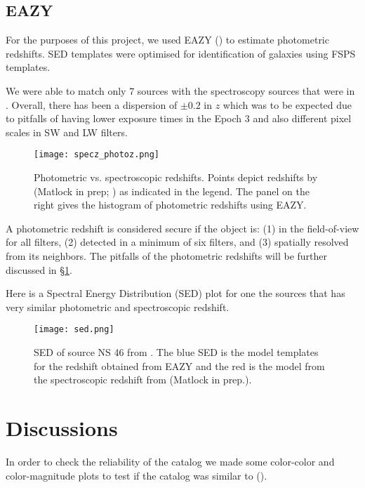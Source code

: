 \documentclass[twocolumn,linenumbers]{aastex631}
\begin{document}
\subsection{EAZY}

For the purposes of this project, we used EAZY (\cite{brammer2008eazy}) to estimate photometric redshifts. SED templates were optimised for identification of galaxies using FSPS templates.

We were able to match only 7 sources with the spectroscopy sources that were in \cite{frye2023jwst}. Overall, there has been a dispersion of $\pm 0.2$ in $z$ which was to be expected due to pitfalls of having lower exposure times in the Epoch 3 and also different pixel scales in SW and LW filters.

\begin{figure}[H]
    \centering\texttt{[image: specz\_photoz.png]}
    \caption{Photometric vs. spectroscopic redshifts. Points depict redshifts by (Matlock in prep; \cite{frye2023jwst}) as indicated in the legend. The panel on the right gives the histogram of photometric redshifts using EAZY.}
    \label{fig:spzph}
\end{figure}

A photometric redshift is considered secure if the object is: (1) in the field-of-view for all filters, (2) detected in a minimum of six filters, and (3) spatially resolved from its neighbors. The pitfalls of the photometric redshifts will be further discussed in \S \ref{sec:disc}.

Here is a Spectral Energy Distribution (SED) plot for one the sources that has very similar photometric and spectroscopic redshift.

\begin{figure}[h]
    \centering
    \texttt{[image: sed.png]}
    \caption{SED of source NS 46 from \cite{frye2023jwst}. The blue SED is the model templates for the redshift obtained from EAZY and the red is the model from the spectroscopic redshift from (Matlock in prep.).}
    \label{fig:sed}
\end{figure}

\section{Discussions} \label{sec:disc}

In order to check the reliability of the catalog we made some color-color and color-magnitude plots to test if the catalog was similar to (\cite{frye2023jwst}). 
\end{document}

